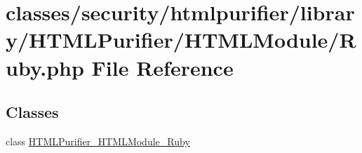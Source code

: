 \hypertarget{Ruby_8php}{\section{classes/security/htmlpurifier/library/\+H\+T\+M\+L\+Purifier/\+H\+T\+M\+L\+Module/\+Ruby.php File Reference}
\label{Ruby_8php}
}
\subsection*{Classes}
\begin{DoxyCompactItemize}
\item 
class \hyperlink{classHTMLPurifier__HTMLModule__Ruby}{H\+T\+M\+L\+Purifier\+\_\+\+H\+T\+M\+L\+Module\+\_\+\+Ruby}
\end{DoxyCompactItemize}
